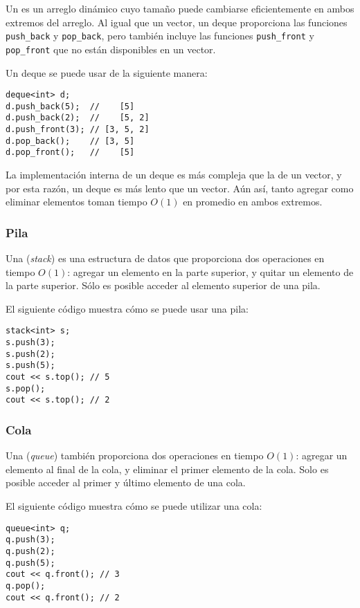 
Un  es un arreglo dinámico
cuyo tamaño puede cambiarse eficientemente
en ambos extremos del arreglo.
Al igual que un vector, un deque proporciona las funciones
\texttt{push\_back} y \texttt{pop\_back}, pero
también incluye las funciones
\texttt{push\_front} y \texttt{pop\_front}
que no están disponibles en un vector.

Un deque se puede usar de la siguiente manera:
\begin{lstlisting}
deque<int> d;
d.push_back(5);  //    [5]
d.push_back(2);  //    [5, 2]
d.push_front(3); // [3, 5, 2]
d.pop_back();    // [3, 5]
d.pop_front();   //    [5]
\end{lstlisting}

La implementación interna de un deque
es más compleja que la de un vector,
y por esta razón, un deque es más lento que un vector.
Aún así, tanto agregar como eliminar
elementos toman tiempo $O(1)$ en promedio en ambos extremos.

\subsubsection{Pila}


Una  (\textit{stack})
es una estructura de datos que proporciona dos
operaciones en tiempo $O(1)$:
agregar un elemento en la parte superior,
y quitar un elemento de la parte superior.
Sólo es posible acceder al elemento superior
de una pila.

El siguiente código muestra cómo se puede usar una pila:
\begin{lstlisting}
stack<int> s;
s.push(3);
s.push(2);
s.push(5);
cout << s.top(); // 5
s.pop();
cout << s.top(); // 2
\end{lstlisting}
\subsubsection{Cola}


Una  (\textit{queue}) también
proporciona dos operaciones en tiempo $O(1)$:
agregar un elemento al final de la cola,
y eliminar el primer elemento de la cola.
Solo es posible acceder al primer
y último elemento de una cola.

El siguiente código muestra cómo se puede utilizar una cola:
\begin{lstlisting}
queue<int> q;
q.push(3);
q.push(2);
q.push(5);
cout << q.front(); // 3
q.pop();
cout << q.front(); // 2
\end{lstlisting}


